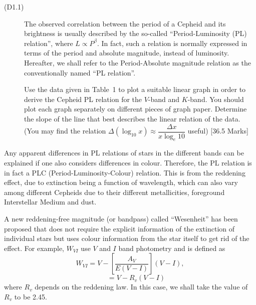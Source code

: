 \begin{description}
\item[(D1.1)] The observed correlation between the period of a Cepheid and its
  brightness is usually described by the so-called ``Period-Luminosity (PL)
  relation'', where $L \propto P^\beta$. In fact, such a relation is normally
  expressed in terms of the period and absolute magnitude, instead of
  luminosity. Hereafter, we shall refer to the Period-Absolute magnitude
  relation as the conventionally named ``PL relation''.

  Use the data given in Table~1 to plot a suitable linear graph in order to
  derive the Cepheid PL relation for the $V$-band and $K$-band. You should
  plot each graph separately on different pieces of graph paper. Determine the
  slope of the line that best describes the linear relation of the data. (You
  may find the relation
  $\Delta(\log_{10} x) \approx \dfrac{\Delta x}{x \log_e 10}$ useful)
  \hfill[36.5 Marks]
\end{description}

Any apparent differences in PL relations of stars in the different bands can
be explained if one also considers differences in colour. Therefore, the PL
relation is in fact a PLC (Period-Luminosity-Colour) relation. This is from
the reddening effect, due to extinction being a function of wavelength, which
can also vary among different Cepheids due to their different metallicities,
foreground Interstellar Medium and dust.

A new reddening-free magnitude (or bandpass) called ``Wesenheit'' has been
proposed that does not require the explicit information of the extinction of
individual stars but uses colour information from the star itself to get rid
of the effect. For example, $W_{VI}$ use $V$ and $I$ band photometry and is
defined as
\[ W_{VI} = V - \left[\frac{A_V}{E(V-I)}\right](V-I), \]
\[ \phantom{W_{VI}} = V - R_v (V-I) \]
where $R_v$ depends on the reddening law. In this case, we shall take the
value of $R_v$ to be 2.45.

